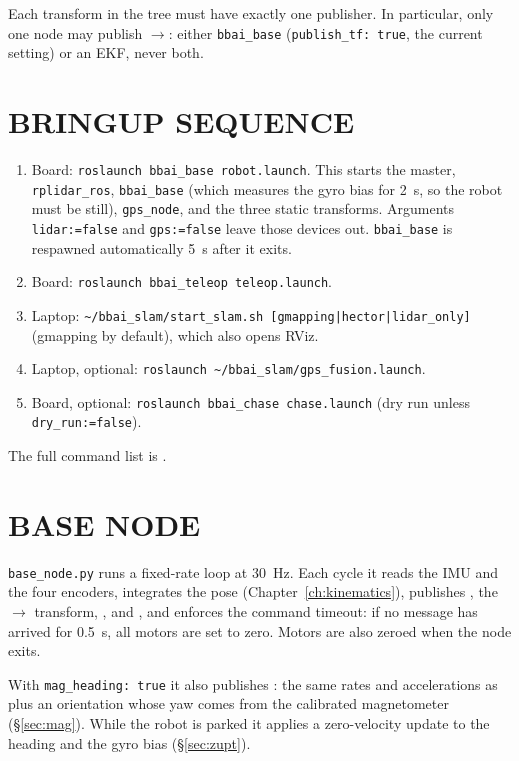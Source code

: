 Each transform in the tree must have exactly one publisher. In particular,
only one node may publish $\to$: either
\texttt{bbai\_base} (\texttt{publish\_tf: true}, the current setting) or an
EKF, never both.

\section{BRINGUP SEQUENCE}

\begin{enumerate}
\item Board: \texttt{roslaunch bbai\_base robot.launch}. This starts the
  master, \texttt{rplidar\_ros}, \texttt{bbai\_base} (which measures the gyro
  bias for \SI{2}{s}, so the robot must be still), \texttt{gps\_node}, and the
  three static transforms. Arguments \texttt{lidar:=false} and
  \texttt{gps:=false} leave those devices out. \texttt{bbai\_base} is
  respawned automatically \SI{5}{s} after it exits.
\item Board: \texttt{roslaunch bbai\_teleop teleop.launch}.
\item Laptop: \texttt{\textasciitilde/bbai\_slam/start\_slam.sh [gmapping|hector|lidar\_only]}
  (gmapping by default), which also opens RViz.
\item Laptop, optional: \texttt{roslaunch \textasciitilde/bbai\_slam/gps\_fusion.launch}.
\item Board, optional: \texttt{roslaunch bbai\_chase chase.launch} (dry run
  unless \texttt{dry\_run:=false}).
\end{enumerate}
The full command list is .

\section{BASE NODE}

\texttt{base\_node.py} runs a fixed-rate loop at \SI{30}{Hz}. Each cycle it
reads the IMU and the four encoders, integrates the pose
(Chapter~\ref{ch:kinematics}), publishes , the
$\to$ transform, ,
 and , and enforces the command timeout:
if no  message has arrived for \SI{0.5}{s}, all motors are
set to zero. Motors are also zeroed when the node exits.

With \texttt{mag\_heading: true} it also publishes : the
same rates and accelerations as  plus an orientation
whose yaw comes from the calibrated magnetometer (\S\ref{sec:mag}). While the
robot is parked it applies a zero-velocity update to the heading and the gyro
bias (\S\ref{sec:zupt}).


